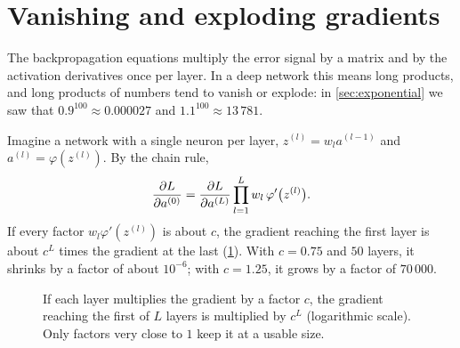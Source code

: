 \section{Vanishing and exploding gradients}\label{sec:vanishing-gradients}

The backpropagation equations multiply the error signal by a matrix and by the
activation derivatives once per layer. In a deep network this means long
products, and long products of numbers tend to vanish or explode: in
\cref{sec:exponential} we saw that $0.9^{100} \approx 0.000027$ and
$1.1^{100} \approx 13\,781$.

\begin{picturethis}
Imagine a network with a single neuron per layer, $z^{(l)} = w_la^{(l-1)}$ and
$a^{(l)} = \varphi(z^{(l)})$. By the chain rule,
\[
  \frac{\partial L}{\partial a^{(0)}} = \frac{\partial L}{\partial a^{(L)}}\prod_{l=1}^L w_l\,\varphi'\bigl(z^{(l)}\bigr).
\]
If every factor $w_l\varphi'(z^{(l)})$ is about $c$, the gradient reaching the first
layer is about $c^L$ times the gradient at the last (\cref{fig:vanishing}). With
$c = 0.75$ and $50$ layers, it shrinks by a factor of about $10^{-6}$; with
$c = 1.25$, it grows by a factor of $70\,000$.
\end{picturethis}

\begin{figure}[htbp]
\centering
{}
\caption{If each layer multiplies the gradient by a factor $c$, the gradient
  reaching the first of $L$ layers is multiplied by $c^L$ (logarithmic scale).
  Only factors very close to $1$ keep it at a usable size.}
\label{fig:vanishing}
\end{figure}

